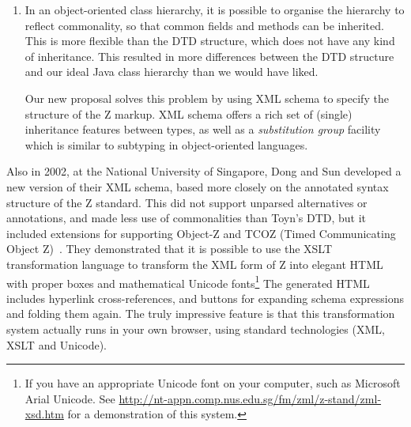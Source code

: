 \documentclass{llncs}  %
\newcommand{\Zeta}{Zeta}
\begin{document}
\begin{enumerate}
  To solve this problem, and make it easier to add new kinds of
  annotations, we have changed to a more loosely-typed view of annotations
  that is similar to the annotations in \Zeta.  Each Z construct can contain
  a list of arbitrary annotations.  Each annotation has a \verb!Kind!
  field, which is a token that indicates the type of the annotation.  This
  means that a tool could attach an annotation to an inappropriate
  construct (such as putting a type annotation on a predicate), but such
  annotations do no harm and can simply be ignored.  On the other hand,
  there are many kinds of annotations (such as hyperlinks, source-code
  positions and comments), that we want to be able to attach to arbitrary
  constructs, and this is easier with these loosely-typed annotations.
  
\item In an object-oriented class hierarchy, it is possible to organise
  the hierarchy to reflect commonality, so that common fields and methods
  can be inherited.  This is more flexible than the DTD structure, which
  does not have any kind of inheritance.  This resulted in more differences
  between the DTD structure and our ideal Java class hierarchy than we
  would have liked. 

  Our new proposal solves this problem by using XML schema to specify the
  structure of the Z markup.  XML schema offers a rich set of (single)
  inheritance features between types, as well as a \emph{substitution
  group} facility which is similar to subtyping in object-oriented
  languages.  
\end{enumerate}


Also in 2002, at the National University of Singapore, Dong and Sun
developed a new version of their XML schema, based more closely on
the annotated syntax structure of the Z standard.  This did not
support unparsed alternatives or annotations, and made less use of
commonalities than Toyn's DTD, but it included extensions 
for supporting Object-Z and TCOZ (Timed Communicating Object Z)~\cite{md99a}.
They demonstrated that it is possible to use the XSLT transformation
language to transform the XML form of Z into elegant HTML with proper boxes
and mathematical Unicode fonts\footnote{If you have an appropriate Unicode
  font on your computer, such as Microsoft Arial Unicode.  See
  \url{http://nt-appn.comp.nus.edu.sg/fm/zml/z-stand/zml-xsd.htm} for 
  a demonstration of this system.} 
The generated HTML includes hyperlink cross-references, and buttons for
expanding schema expressions and folding them again.  The truly impressive
feature is that this transformation system actually runs in your own
browser, using standard technologies (XML, XSLT and Unicode).
\end{document}
